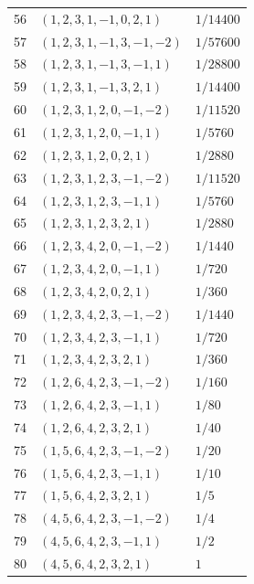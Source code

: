 \begin{longtable}{@{}rll@{}}
56 & $(1,2,3,1,-1,0,2,1)$ & $1/14400$\\
57 & $(1,2,3,1,-1,3,-1,-2)$ & $1/57600$\\
58 & $(1,2,3,1,-1,3,-1,1)$ & $1/28800$\\
59 & $(1,2,3,1,-1,3,2,1)$ & $1/14400$\\
60 & $(1,2,3,1,2,0,-1,-2)$ & $1/11520$\\
61 & $(1,2,3,1,2,0,-1,1)$ & $1/5760$\\
62 & $(1,2,3,1,2,0,2,1)$ & $1/2880$\\
63 & $(1,2,3,1,2,3,-1,-2)$ & $1/11520$\\
64 & $(1,2,3,1,2,3,-1,1)$ & $1/5760$\\
65 & $(1,2,3,1,2,3,2,1)$ & $1/2880$\\
66 & $(1,2,3,4,2,0,-1,-2)$ & $1/1440$\\
67 & $(1,2,3,4,2,0,-1,1)$ & $1/720$\\
68 & $(1,2,3,4,2,0,2,1)$ & $1/360$\\
69 & $(1,2,3,4,2,3,-1,-2)$ & $1/1440$\\
70 & $(1,2,3,4,2,3,-1,1)$ & $1/720$\\
71 & $(1,2,3,4,2,3,2,1)$ & $1/360$\\
72 & $(1,2,6,4,2,3,-1,-2)$ & $1/160$\\
73 & $(1,2,6,4,2,3,-1,1)$ & $1/80$\\
74 & $(1,2,6,4,2,3,2,1)$ & $1/40$\\
75 & $(1,5,6,4,2,3,-1,-2)$ & $1/20$\\
76 & $(1,5,6,4,2,3,-1,1)$ & $1/10$\\
77 & $(1,5,6,4,2,3,2,1)$ & $1/5$\\
78 & $(4,5,6,4,2,3,-1,-2)$ & $1/4$\\
79 & $(4,5,6,4,2,3,-1,1)$ & $1/2$\\
80 & $(4,5,6,4,2,3,2,1)$ & $1$\\
\end{longtable}
\endgroup

